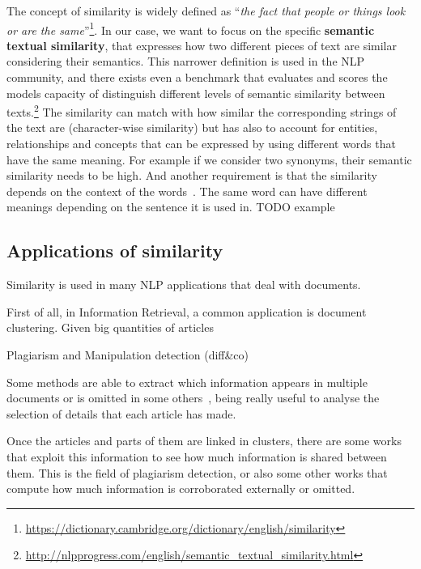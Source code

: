 The concept of similarity is widely defined as ``\emph{the fact that people or things look or are the same}''\footnote{\url{https://dictionary.cambridge.org/dictionary/english/similarity}}. In our case, we want to focus on the specific \textbf{semantic textual similarity}, that expresses how two different pieces of text are similar considering their semantics.
This narrower definition is used in the NLP community, and there exists even a benchmark that evaluates and scores the models capacity of distinguish different levels of semantic similarity between texts.\footnote{\url{http://nlpprogress.com/english/semantic\_textual\_similarity.html}}
The similarity can match with how similar the corresponding strings of the text are (character-wise similarity) but has also to account for entities, relationships and concepts that can be expressed by using different words that have the same meaning.
For example if we consider two synonyms, their semantic similarity needs to be high. 
And another requirement is that the similarity depends on the context of the words~\cite{miller1991contextual}. The same word can have different meanings depending on the sentence it is used in.
TODO example

\subsection{Applications of similarity}

Similarity is used in many NLP applications that deal with documents.

First of all, in Information Retrieval, a common application is document clustering. Given big quantities of articles





Plagiarism and Manipulation detection (diff\&co)

Some methods are able to extract which information appears in multiple documents or is omitted in some others~\cite{bountouridis2018explaining}, being really useful to analyse the selection of details that each article has made.

Once the articles and parts of them are linked in clusters, there are some works that exploit this information to see how much information is shared between them. This is the field of plagiarism detection, or also some other works that compute how much information is corroborated externally or omitted.



